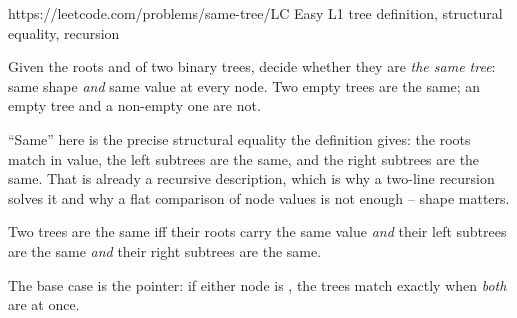   {https://leetcode.com/problems/same-tree/}{LC Easy L1}
  {tree definition, structural equality, recursion}

\begin{problemstatement}
Given the roots  and  of two binary trees, decide whether they are
\emph{the same tree}: same shape \emph{and} same value at every node. Two empty trees
are the same; an empty tree and a non-empty one are not.
\end{problemstatement}

``Same'' here is the precise structural equality the definition gives: the roots match in
value, the left subtrees are the same, and the right subtrees are the same. That is
already a recursive description, which is why a two-line recursion solves it and why a
flat comparison of node values is not enough -- shape matters.

\begin{observation}
Two trees are the same iff their roots carry the same value \emph{and} their left
subtrees are the same \emph{and} their right subtrees are the same.
\end{observation}
\begin{observation}
The base case is the \nil{} pointer: if either node is \nil, the trees match exactly
when \emph{both} are \nil{} at once.
\end{observation}

\begin{thinkbox}
\end{thinkbox}

